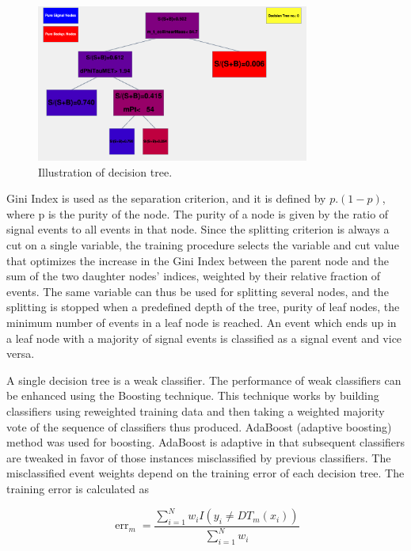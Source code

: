 \begin{figure}[htbp]
  \centering
  \includegraphics[width=0.8\textwidth]{plots/chapter6/BDT/BDT.png}
  \caption{Illustration of decision tree.}
  \label{fig:dec_tree}
\end{figure}

Gini Index is used as the separation criterion, and it is defined by $p.(1 - p)$, where p is the purity of the node. The purity of a node is given by the ratio of signal events to all events in that node. Since the splitting criterion is always a cut on a single variable, the training procedure selects the variable and cut value that optimizes the increase in the Gini Index between the parent node and the sum of the two daughter nodes' indices, weighted by their relative fraction of events. The same variable can thus be used for splitting several nodes, and the splitting is stopped when a predefined depth of the tree, purity of leaf nodes, the minimum number of events in a leaf node is reached. An event which ends up in a leaf node with a majority of signal events is classified as a signal event and vice versa.

A single decision tree is a weak classifier. The performance of weak classifiers can be enhanced using the Boosting technique. This technique works by building classifiers using reweighted training data and then taking a weighted majority vote of the sequence of classifiers thus produced. AdaBoost (adaptive boosting) method was used for boosting. AdaBoost is adaptive in that subsequent classifiers are tweaked in favor of those instances misclassified by previous classifiers. The misclassified event weights depend on the training error of each decision tree. The training error is calculated as

\begin{equation}
  \operatorname{err}_{m}=\frac{\sum_{i=1}^{N} w_{i} I\left(y_{i} \neq DT_{m}\left(x_{i}\right)\right)}{\sum_{i=1}^{N} w_{i}}
\end{equation}

